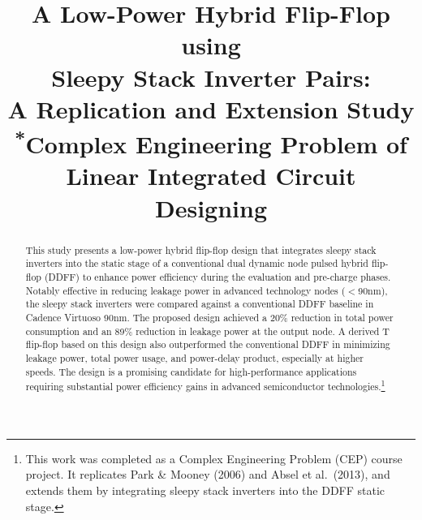 \documentclass[conference]{IEEEtran}
\begin{document}
\title{A Low-Power Hybrid Flip-Flop using\\ Sleepy Stack Inverter Pairs:\\
A Replication and Extension Study\\
{\footnotesize \textsuperscript{*}Complex Engineering Problem of Linear Integrated Circuit Designing}
}

\author{
\and
{}
\and
{}
}

\maketitle

\begin{abstract}
This study presents a low-power hybrid flip-flop design that integrates sleepy stack inverters into the static stage of a conventional dual dynamic node pulsed hybrid flip-flop (DDFF) to enhance power efficiency during the evaluation and pre-charge phases. Notably effective in reducing leakage power in advanced technology nodes ($<$90nm), the sleepy stack inverters were compared against a conventional DDFF baseline in Cadence Virtuoso 90nm. The proposed design achieved a 20\% reduction in total power consumption and an 89\% reduction in leakage power at the output node. A derived T flip-flop based on this design also outperformed the conventional DDFF in minimizing leakage power, total power usage, and power-delay product, especially at higher speeds. The design is a promising candidate for high-performance applications requiring substantial power efficiency gains in advanced semiconductor technologies.\footnote{This work was completed as a Complex Engineering Problem (CEP) course project. It replicates Park \& Mooney (2006) and Absel et al.~(2013), and extends them by integrating sleepy stack inverters into the DDFF static stage.}
\end{abstract}
\end{document}
